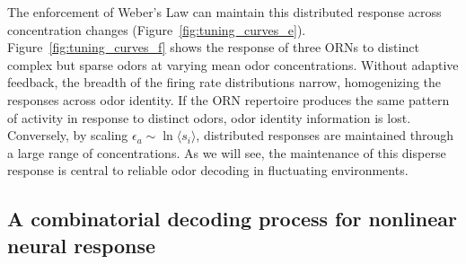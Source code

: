 The enforcement of Weber's Law can maintain this distributed response across concentration changes (Figure~\ref{fig:tuning_curves_e}). Figure~\ref{fig:tuning_curves_f} shows the response of three ORNs to distinct complex but sparse odors at varying mean odor concentrations. Without adaptive feedback, the breadth of the firing rate distributions narrow, homogenizing the responses across odor identity. If the ORN repertoire produces the same pattern of activity in response to distinct odors, odor identity information is lost. Conversely, by scaling $\epsilon_a \sim \ln \langle s_i \rangle$, distributed responses are maintained through a large range of concentrations. As we will see, the maintenance of this disperse response is central to reliable odor decoding in fluctuating  environments. 









\subsection{A combinatorial decoding process for nonlinear neural response}

